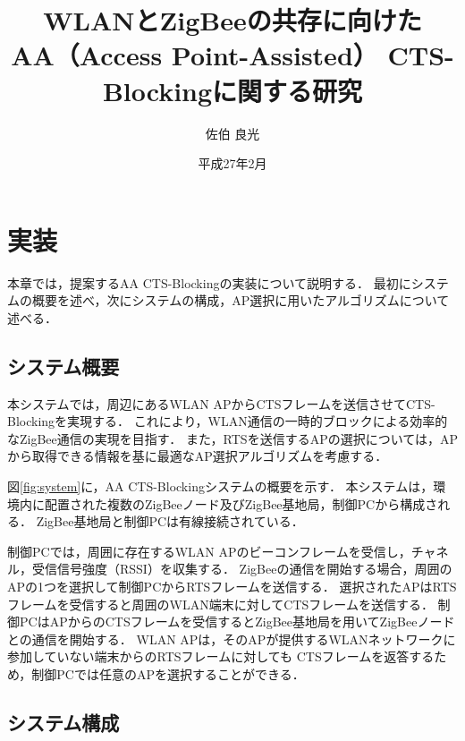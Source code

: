 \documentclass[12pt]{jreport}
\date{平成27年2月}
\title{\fontsize{15.5pt}{25pt}\selectfont WLANとZigBeeの共存に向けた\\AA（Access Point-Assisted） CTS-Blockingに関する研究}
\author{佐伯 良光}
\begin{document}
\maketitle


\chapter{実装}\label{implement}%
本章では，提案するAA CTS-Blockingの実装について説明する．
最初にシステムの概要を述べ，次にシステムの構成，AP選択に用いたアルゴリズムについて述べる．\\



\section{システム概要}

本システムでは，周辺にあるWLAN APからCTSフレームを送信させてCTS-Blockingを実現する．
これにより，WLAN通信の一時的ブロックによる効率的なZigBee通信の実現を目指す．
また，RTSを送信するAPの選択については，APから取得できる情報を基に最適なAP選択アルゴリズムを考慮する．

図\ref{fig:system}に，AA CTS-Blockingシステムの概要を示す．
本システムは，環境内に配置された複数のZigBeeノード及びZigBee基地局，制御PCから構成される．
ZigBee基地局と制御PCは有線接続されている．

制御PCでは，周囲に存在するWLAN APのビーコンフレームを受信し，チャネル，受信信号強度（RSSI）を収集する．
ZigBeeの通信を開始する場合，周囲のAPの1つを選択して制御PCからRTSフレームを送信する．
選択されたAPはRTSフレームを受信すると周囲のWLAN端末に対してCTSフレームを送信する．
制御PCはAPからのCTSフレームを受信するとZigBee基地局を用いてZigBeeノードとの通信を開始する．
WLAN APは，そのAPが提供するWLANネットワークに参加していない端末からのRTSフレームに対しても
CTSフレームを返答するため，制御PCでは任意のAPを選択することができる．

\section{システム構成}
\end{document}
